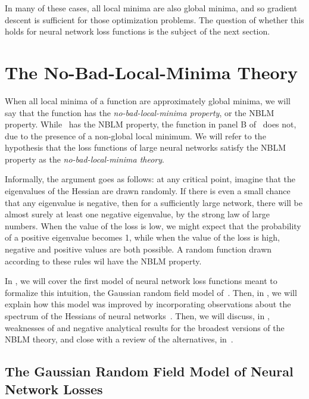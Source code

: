 \documentclass[../../thesis.tex]{subfiles}
\begin{document}
In many of these cases,
all local minima are also global minima,
and so gradient descent is sufficient for
those optimization problems.
The question of whether this holds for neural network loss functions
is the subject of the next section.

\section{The No-Bad-Local-Minima Theory}

When all local minima of a function
are approximately global minima,
we will say that the function has the
\emph{no-bad-local-minima property},
or the NBLM property.
While~ has the NBLM property,
the function in panel B of~
does not, due to the presence of a non-global local minimum.
We will refer to the hypothesis that
the loss functions of large neural networks
satisfy the NBLM property as the
\emph{no-bad-local-minima theory}.

Informally, the argument goes as follows:
at any critical point, imagine that the eigenvalues
of the Hessian are drawn randomly.
If there is even a small chance that any eigenvalue is negative,
then for a sufficiently large network,
there will be almost surely at least one negative eigenvalue,
by the strong law of large numbers.
When the value of the loss is low,
we might expect that the probability of a positive eigenvalue becomes 1,
while when the value of the loss is high,
negative and positive values are both possible.
A random function drawn according to these rules
wil have the NBLM property.

In ,
we will cover the first model of neural network loss functions
meant to formalize this intuition,
the Gaussian random field model of~\cite{dauphin2014}.
Then, in ,
we will explain how this model was improved
by incorporating observations about the spectrum
of the Hessians of neural networks~\cite{pennington2017}.
Then, we will discuss, in ,
weaknesses of and negative analytical results for
the broadest versions of the NBLM theory,
and close with a review of the alternatives,
in~.

\subsection{The Gaussian Random Field Model of Neural Network Losses}
\end{document}
